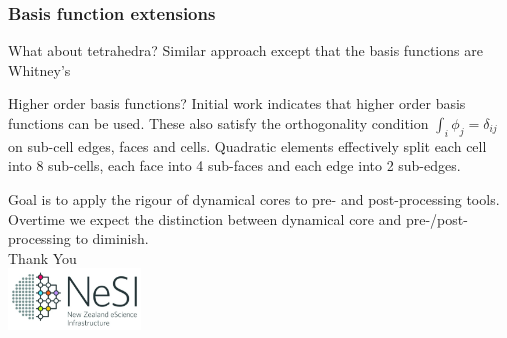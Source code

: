 \documentclass[aspectratio=169]{beamer}
\newcommand\BackgroundPicture[1]{%
\setbeamertemplate{background}{%
\parbox[c][\paperheight]{\paperwidth}{%
\vfill \hfill \texttt{[image: \#1]}
\hfill \vfill
}}}
\begin{document}
\begin{frame}[t]
  \frametitle{Basis function extensions}
    \begin{block}{What about tetrahedra?}
      Similar approach except that the basis functions are Whitney's
    \end{block}
    \begin{block}{Higher order basis functions?}
    Initial work indicates that higher order basis functions can be used. These also satisfy the orthogonality condition $\int_i \phi_j = \delta_{ij}$
    on sub-cell edges, faces and cells. Quadratic elements effectively 
     split each cell into 8 sub-cells, each face into 4 sub-faces and each edge into 2 sub-edges. 
  \end{block}
\end{frame}

\BackgroundPicture{NeSI/blank-02.png}
\begin{frame}[plain]
  \begin{center}
  Goal is to apply the rigour of dynamical cores to pre- and post-processing tools. Overtime we expect the distinction between dynamical core
  and pre-/post-processing to diminish.
  \\
  
    \vspace*{+2cm}
    {\Huge Thank You}\\
    \vspace*{+1cm}
    \includegraphics[width=100pt]{NeSI/nesi_logo.png}
  \end{center}
\end{frame}
\end{document}
